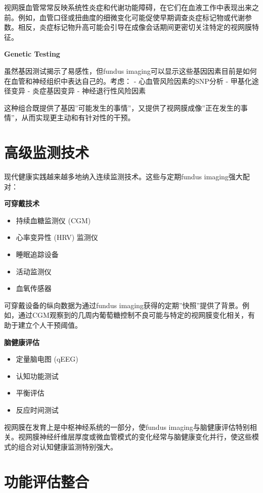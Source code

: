 \documentclass[
  Letterpaper,
]{scrbook}
\providecommand{\tightlist}{%
  \setlength{\itemsep}{0pt}\setlength{\parskip}{0pt}}\usepackage{longtable,booktabs,array}
\begin{document}
视网膜血管常常反映系统性炎症和代谢功能障碍，在它们在血液工作中表现出来之前。例如，血管口径或扭曲度的细微变化可能促使早期调查炎症标记物或代谢参数。相反，炎症标记物升高可能会引导在成像会话期间更密切关注特定的视网膜特征。

\textbf{Genetic Testing}

虽然基因测试揭示了易感性，但fundus
imaging可以显示这些基因因素目前是如何在血管和神经组织中表达自己的。考虑：
- 心血管风险因素的SNP分析 - 甲基化途径变异 - 炎症基因变异 -
神经退行性风险因素

这种组合既提供了基因''可能发生的事情''，又提供了视网膜成像''正在发生的事情''，从而实现更主动和有针对性的干预。

\section{高级监测技术}\label{ux9ad8ux7ea7ux76d1ux6d4bux6280ux672f}

现代健康实践越来越多地纳入连续监测技术。这些与定期fundus
imaging强大配对：

\textbf{可穿戴技术}

\begin{itemize}
\tightlist
\item
  持续血糖监测仪 (CGM)
\item
  心率变异性 (HRV) 监测仪
\item
  睡眠追踪设备
\item
  活动监测仪
\item
  血氧传感器
\end{itemize}

可穿戴设备的纵向数据为通过fundus
imaging获得的定期''快照''提供了背景。例如，通过CGM观察到的几周内葡萄糖控制不良可能与特定的视网膜变化相关，有助于建立个人干预阈值。

\textbf{脑健康评估}

\begin{itemize}
\tightlist
\item
  定量脑电图 (qEEG)
\item
  认知功能测试
\item
  平衡评估
\item
  反应时间测试
\end{itemize}

视网膜在发育上是中枢神经系统的一部分，使fundus
imaging与脑健康评估特别相关。视网膜神经纤维层厚度或微血管模式的变化经常与脑健康变化并行，使这些模式的组合对认知健康监测特别强大。

\section{功能评估整合}\label{ux529fux80fdux8bc4ux4f30ux6574ux5408}
\end{document}
